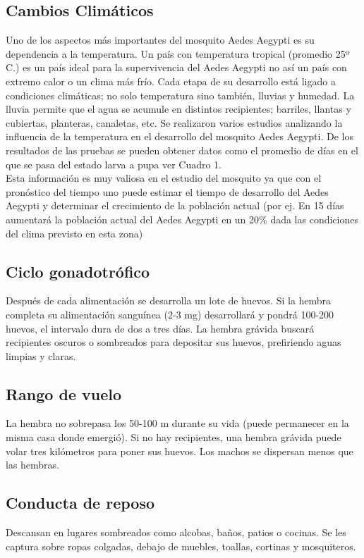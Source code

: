 \subsection{Cambios Climáticos}

Uno de los aspectos más importantes del mosquito Aedes Aegypti es su dependencia a la temperatura. Un país con temperatura tropical (promedio 25º C.) es un país ideal para la supervivencia del Aedes Aegypti no así un país con extremo calor o un clima más frío. Cada etapa de su desarrollo está ligado a condiciones climáticas; no solo temperatura sino también, lluvias y humedad. La lluvia permite que el agua se acumule en distintos recipientes; barriles, llantas y cubiertas, planteras, canaletas, etc. Se realizaron varios estudios analizando la influencia de la temperatura en el desarrollo del mosquito Aedes Aegypti. De los resultados de las pruebas se pueden obtener datos como el promedio de días en el que se pasa del estado larva a pupa ver Cuadro 1.\\

Esta información es muy valiosa en el estudio del mosquito ya que con el pronóstico del tiempo uno puede estimar el tiempo de desarrollo del Aedes Aegypti y determinar el crecimiento de la población actual (por ej. En 15 días aumentará la población actual del Aedes Aegypti en un 20\% dada las condiciones del clima previsto en esta zona)

\subsection{Ciclo gonadotrófico}
Después de cada alimentación se desarrolla un lote de huevos. Si la hembra completa su alimentación sanguínea (2-3 mg) desarrollará y pondrá 100-200 huevos, el intervalo dura de dos a tres días. La hembra grávida buscará recipientes oscuros o sombreados para depositar sus huevos, prefiriendo aguas limpias y claras.\\

\subsection{Rango de vuelo}
La hembra no sobrepasa los 50-100 m durante su vida (puede permanecer en la misma casa donde emergió). Si no hay recipientes, una hembra grávida puede volar tres kilómetros para poner sus huevos. Los machos se dispersan menos que las hembras.\\

\subsection{Conducta de reposo}
Descansan en lugares sombreados como alcobas, baños, patios o cocinas. Se les captura sobre ropas colgadas, debajo de muebles, toallas, cortinas y mosquiteros.\\

